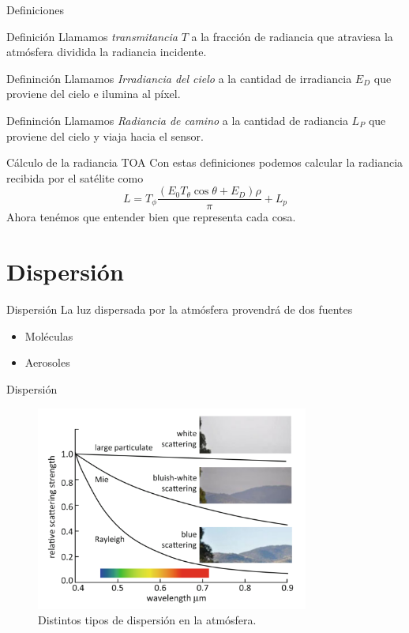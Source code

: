\documentclass[]{beamer}
\begin{document}
\begin{frame}{Definiciones}
  \begin{block}{Definición}
    Llamamos \emph{transmitancia} $T$ a la fracción de radiancia que atraviesa la atmósfera dividida la radiancia incidente.
  \end{block}\pause
  \begin{block}{Defininción}
    Llamamos \emph{Irradiancia del cielo} a la cantidad de irradiancia $E_D$ que proviene del cielo e ilumina al píxel.
  \end{block}
  \pause
  \begin{block}{Defininción}
    Llamamos \emph{Radiancia de camino} a la cantidad de radiancia $L_P$ que proviene del cielo y viaja hacia el sensor.
  \end{block}
\end{frame}

\begin{frame}{Cálculo de la radiancia TOA}
  Con estas definiciones podemos calcular la radiancia recibida por el satélite como
  \begin{equation}
    L = T_\phi \frac{(E_0 T_\theta \cos \theta + E_D)\rho}{\pi} + L_p
  \end{equation}\pause
  Ahora tenémos que entender bien que representa cada cosa.
\end{frame}

\section{Dispersión}
\begin{frame}{Dispersión}
  La luz dispersada por la atmósfera provendrá de dos fuentes
  \begin{itemize}
    \item Moléculas
    \item Aerosoles
  \end{itemize}
\end{frame}
\begin{frame}{Dispersión}
  \begin{figure}
  \centering
  \includegraphics[width=0.8\textwidth]{imagenes/dispersion.png}
  \caption{Distintos tipos de dispersión en la atmósfera.}
  \end{figure}
\end{frame}
\end{document}
